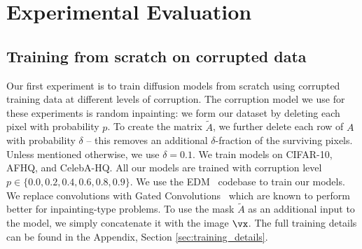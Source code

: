 \documentclass{article}
\begin{document}
\section{Experimental Evaluation}
\subsection{Training from scratch on corrupted data}
Our first experiment is to train diffusion models from scratch using corrupted training data at different levels of corruption. The corruption model we use for these experiments is random inpainting: we form our dataset by deleting each pixel with probability $p$. To create the matrix $\tilde{A}$, we further delete each row of $A$ with probability $\delta$ -- this removes an additional $\delta$-fraction of the surviving pixels. Unless mentioned otherwise, we use $\delta=0.1$. 
We train models on CIFAR-10, AFHQ, and CelebA-HQ. All our models are trained with corruption level $p \in \{0.0, 0.2, 0.4, 0.6, 0.8, 0.9\}$. We use the EDM~\citep{karras2022elucidating} codebase to train our models. We replace convolutions with Gated Convolutions~\citep{gated_conv} which are known to perform better for inpainting-type problems. To use the mask $\tilde A$ as an additional input to the model, we simply concatenate it with the image $\vx$. The full training details can be found in the Appendix, Section \ref{sec:training_details}.
\end{document}
